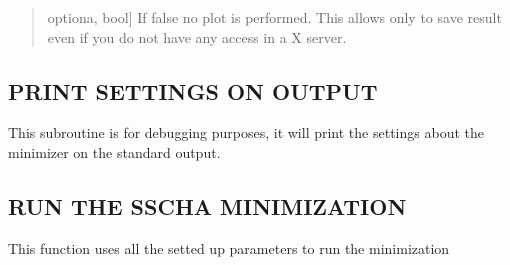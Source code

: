 \documentclass[a4paper,11pt,english]{sphinxmanual}
\begin{document}
\begin{fulllineitems}
\begin{fulllineitems}
\begin{quote}
\begin{description}
\sphinxlineitem{plot}{[}optiona, bool{]}
\sphinxAtStartPar
If false no plot is performed. This allows only to save result
even if you do not have any access in a X server.

\end{description}
\end{quote}

\end{fulllineitems}


\begin{fulllineitems}
\label{\detokenize{apireference:sscha.SchaMinimizer.SSCHA_Minimizer.print_info}}
\pysigstartsignatures
{}
\pysigstopsignatures

\subsection{PRINT SETTINGS ON OUTPUT}
\label{\detokenize{apireference:print-settings-on-output}}
\sphinxAtStartPar
This subroutine is for debugging purposes, it will print the settings about
the minimizer on the standard output.

\end{fulllineitems}


\begin{fulllineitems}
\label{\detokenize{apireference:sscha.SchaMinimizer.SSCHA_Minimizer.run}}
\pysigstartsignatures
{}
\pysigstopsignatures

\subsection{RUN THE SSCHA MINIMIZATION}
\label{\detokenize{apireference:run-the-sscha-minimization}}
\sphinxAtStartPar
This function uses all the setted up parameters to run the minimization


\end{fulllineitems}
\end{fulllineitems}
\end{document}
